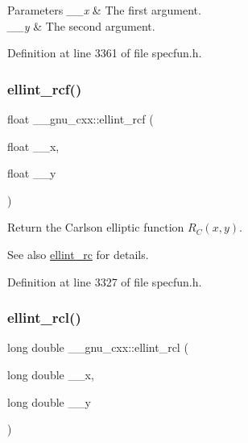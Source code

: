 \begin{DoxyParams}{Parameters}
{\em \+\_\+\+\_\+x} & The first argument. \\
\hline
{\em \+\_\+\+\_\+y} & The second argument. \\
\hline
\end{DoxyParams}


Definition at line 3361 of file specfun.\+h.

\mbox{\label{group__gnu__math__spec__func_gaad5316092224ec3d92b66e79ef266adf}} 
\subsubsection{\texorpdfstring{ellint\+\_\+rcf()}{ellint\_rcf()}}
{\footnotesize\ttfamily float \+\_\+\+\_\+gnu\+\_\+cxx\+::ellint\+\_\+rcf (\begin{DoxyParamCaption}\item[{float}]{\+\_\+\+\_\+x,  }\item[{float}]{\+\_\+\+\_\+y }\end{DoxyParamCaption})\hspace{0.3cm}{\ttfamily [inline]}}

Return the Carlson elliptic function $ R_C(x,y) $.

\begin{DoxySeeAlso}{See also}
\hyperlink{group__gnu__math__spec__func_ga7d3d42f5f71a74266be8aaca528056bf}{ellint\+\_\+rc} for details. 
\end{DoxySeeAlso}


Definition at line 3327 of file specfun.\+h.

\mbox{\label{group__gnu__math__spec__func_ga9b2f1cdeacd3615c702a77d995a0129c}} 
\subsubsection{\texorpdfstring{ellint\+\_\+rcl()}{ellint\_rcl()}}
{\footnotesize\ttfamily long double \+\_\+\+\_\+gnu\+\_\+cxx\+::ellint\+\_\+rcl (\begin{DoxyParamCaption}\item[{long double}]{\+\_\+\+\_\+x,  }\item[{long double}]{\+\_\+\+\_\+y }\end{DoxyParamCaption})\hspace{0.3cm}{\ttfamily [inline]}}

